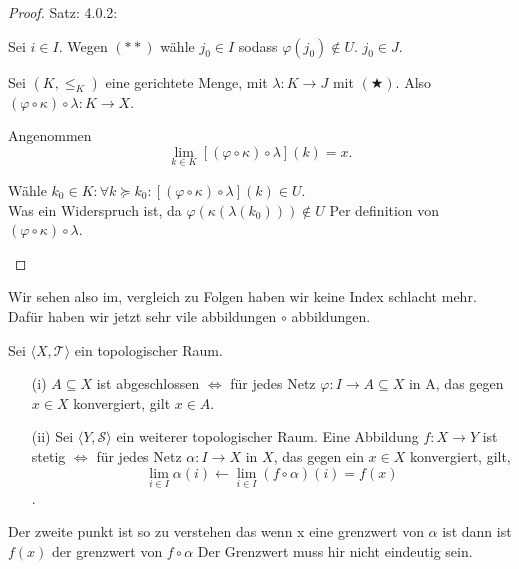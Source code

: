 \begin{proof}{Satz: 4.0.2:}
\begin{itemize}
        Sei $i \in I$.
        Wegen $(**)$ wähle $j_0 \in I$ 
        sodass $\varphi(j_0) \notin U$. 
        $j_0 \in J$.

        Sei $(K, \le_K)$ eine gerichtete Menge, mit 
        $\lambda : K \to J$ mit $(\bigstar)$.
        Also $(\varphi \circ \kappa) \circ \lambda : K \to X$.

        Angenommen 
        $$
        \lim_{k \in K} [(\varphi \circ \kappa) \circ \lambda](k) = x.
        $$

        Wähle $k_0 \in K : \forall k \succeq k_0 : [(\varphi \circ \kappa) \circ \lambda](k) \in U.$ \\
        Was ein Widerspruch ist, da $\varphi(\kappa(\lambda(k_0))) \notin U$
        Per definition von $(\varphi \circ \kappa) \circ \lambda$.

    \end{itemize}
\end{proof}

Wir sehen also im, vergleich zu Folgen haben wir keine Index schlacht
mehr. 
Dafür haben wir jetzt sehr vile abbildungen $\circ$ abbildungen.

\thm{}
{
    Sei $\langle X, \mathcal{T} \rangle$ ein topologischer Raum.
    \begin{itemize}
        \item[(i)] $A \subseteq X$ ist abgeschlossen $\Leftrightarrow$
        für jedes Netz $\varphi : I \to A \subseteq X$  in A, 
        das gegen $x \in X$ konvergiert, gilt $x \in A$.
        \item[(ii)] Sei $\langle Y, \mathcal{S} \rangle$ ein weiterer topologischer Raum.
        Eine Abbildung $f : X \to Y$ ist stetig $\Leftrightarrow$
        für jedes Netz $\alpha : I \to X$ in $X$, das gegen ein $x \in X$ konvergiert,
        gilt, 
        $$
        \lim_{i \in I} \alpha(i) 
        \leftarrow \lim_{i \in I} (f \circ \alpha)(i) = f(x)
        $$.
    \end{itemize}
}

Der zweite punkt ist so zu verstehen das wenn x eine grenzwert von $\alpha$ ist
dann ist $f(x)$ der grenzwert von $f \circ \alpha$
Der Grenzwert muss hir nicht eindeutig sein.

